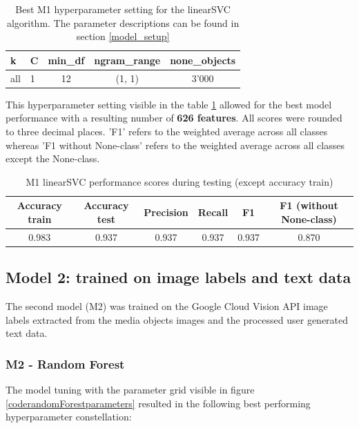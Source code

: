 \begin{table}[h!]
\begin{center}
\caption{Best M1 hyperparameter setting for the linearSVC algorithm. The parameter descriptions can be found in section \ref{model_setup}}\vspace{1ex}
\label{tab:m1_linearSVC_bestParams}
\begin{tabular}{llccc}\hline
k & C & min\_df & ngram\_range & none\_objects \\ \hline
all & 1 & 12 & (1, 1) & 3'000 \\ \hline
\end{tabular}
\end{center}
\end{table}

This hyperparameter setting visible in the table \ref{tab:m1_linearSVC_bestParams} allowed for the best model performance with a resulting number of \textbf{626 features}. All scores were rounded to three decimal places. 'F1' refers to the weighted average across all classes whereas 'F1 without None-class' refers to the weighted average across all classes except the None-class.

\begin{table}[h!]
\begin{center}
\caption{M1 linearSVC performance scores during testing (except accuracy train)}\vspace{1ex}
\label{tab:m1_linearSVC_bestscores}
\begin{tabular}{cccccc}\hline
Accuracy train & Accuracy test & Precision & Recall & F1 & F1 (without None-class)\\ \hline
0.983 & 0.937 & 0.937 & 0.937 & 0.937 & 0.870 \\ \hline
\end{tabular}
\end{center}
\end{table}

\subsection{Model 2: trained on image labels and text data}
The second model (M2) was trained on the Google Cloud Vision API image labels extracted from the media objects images and the processed user generated text data.

\subsubsection{M2 - Random Forest}
The model tuning with the parameter grid visible in figure \ref{coderandomForestparameters} resulted in the following best performing hyperparameter constellation:\\

